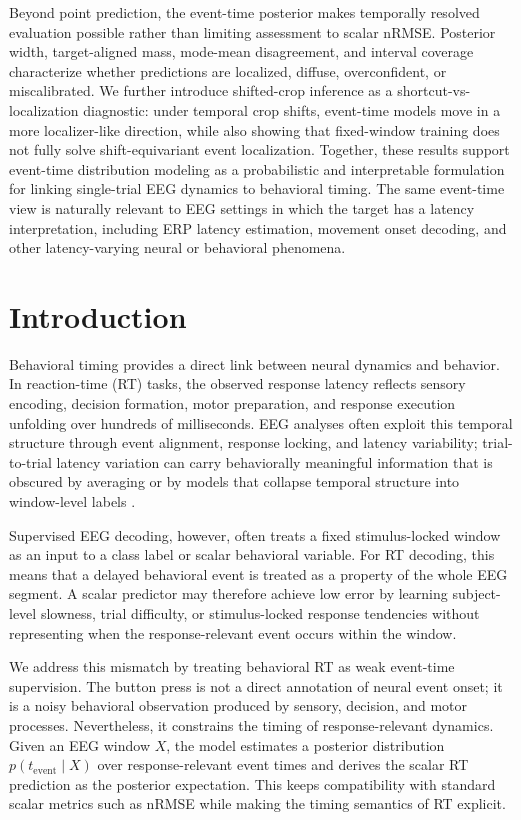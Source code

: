 \documentclass[12pt]{article}
\begin{document}
Beyond point prediction, the event-time posterior makes temporally resolved evaluation possible rather than limiting assessment to scalar nRMSE. Posterior width, target-aligned mass, mode-mean disagreement, and interval coverage characterize whether predictions are localized, diffuse, overconfident, or miscalibrated. We further introduce shifted-crop inference as a shortcut-vs-localization diagnostic: under temporal crop shifts, event-time models move in a more localizer-like direction, while also showing that fixed-window training does not fully solve shift-equivariant event localization. Together, these results support event-time distribution modeling as a probabilistic and interpretable formulation for linking single-trial EEG dynamics to behavioral timing. The same event-time view is naturally relevant to EEG settings in which the target has a latency interpretation, including ERP latency estimation, movement onset decoding, and other latency-varying neural or behavioral phenomena.






\section{Introduction}

Behavioral timing provides a direct link between neural dynamics and behavior. In reaction-time (RT) tasks, the observed response latency reflects sensory encoding, decision formation, motor preparation, and response execution unfolding over hundreds of milliseconds. EEG analyses often exploit this temporal structure through event alignment, response locking, and latency variability; trial-to-trial latency variation can carry behaviorally meaningful information that is obscured by averaging or by models that collapse temporal structure into window-level labels \citep{Jung1998SingleTrialERP,Ouyang2017LatencyReview}.

Supervised EEG decoding, however, often treats a fixed stimulus-locked window as an input to a class label or scalar behavioral variable. For RT decoding, this means that a delayed behavioral event is treated as a property of the whole EEG segment. A scalar predictor may therefore achieve low error by learning subject-level slowness, trial difficulty, or stimulus-locked response tendencies without representing when the response-relevant event occurs within the window.

We address this mismatch by treating behavioral RT as weak event-time supervision. The button press is not a direct annotation of neural event onset; it is a noisy behavioral observation produced by sensory, decision, and motor processes. Nevertheless, it constrains the timing of response-relevant dynamics. Given an EEG window \(X\), the model estimates a posterior distribution \(p(t_{\mathrm{event}}\mid X)\) over response-relevant event times and derives the scalar RT prediction as the posterior expectation. This keeps compatibility with standard scalar metrics such as nRMSE while making the timing semantics of RT explicit.
\end{document}

